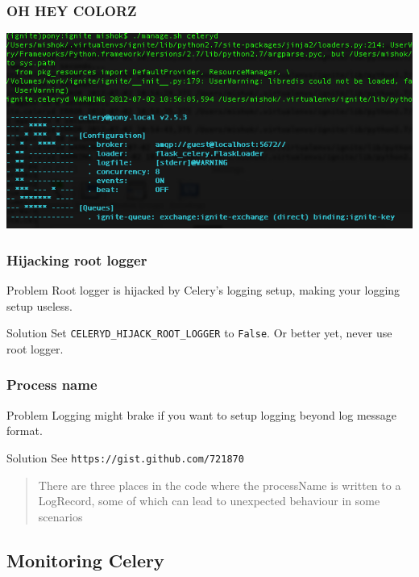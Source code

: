 \documentclass{beamer}
\begin{document}
\begin{frame}
  \frametitle{OH HEY COLORZ}
  \includegraphics[scale=0.5]{images/celery-colored.png}
\end{frame}

\begin{frame}
  \frametitle{Hijacking root logger}
  \begin{block}{Problem}
    Root logger is hijacked by Celery's logging setup, making your logging
    setup useless.
  \end{block}
  \begin{block}{Solution}
    Set \texttt{CELERYD\_HIJACK\_ROOT\_LOGGER} to \texttt{False}. Or better
    yet, never use root logger.
  \end{block}
\end{frame}

\begin{frame}
  \frametitle{Process name}
  \begin{block}{Problem}
    Logging might brake if you want to setup logging beyond log message
    format.
  \end{block}
  \begin{block}{Solution}
    See \texttt{https://gist.github.com/721870}
    \begin{quotation}
      There are three places in the code where the processName is written to a
      LogRecord, some of which can lead to unexpected behaviour in some scenarios
  \end{quotation}
  \end{block}
\end{frame}

\subsection{Monitoring Celery}

\end{document}
